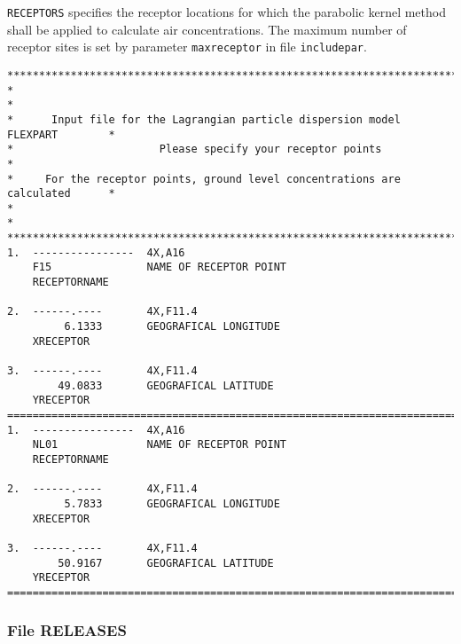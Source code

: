 \documentclass{egu}                  %
\begin{document}
\verb|RECEPTORS| specifies the receptor locations for which the parabolic
kernel method shall be applied to calculate air concentrations.  The maximum
number of receptor sites is set by parameter \verb|maxreceptor| in file
\verb|includepar|.
\begin{scriptsize}\begin{verbatim}
********************************************************************************
*                                                                              *
*      Input file for the Lagrangian particle dispersion model FLEXPART        * 
*                       Please specify your receptor points                    * 
*     For the receptor points, ground level concentrations are calculated      * 
*                                                                              *
********************************************************************************
1.  ----------------  4X,A16
    F15               NAME OF RECEPTOR POINT
    RECEPTORNAME

2.  ------.----       4X,F11.4
         6.1333       GEOGRAFICAL LONGITUDE
    XRECEPTOR

3.  ------.----       4X,F11.4
        49.0833       GEOGRAFICAL LATITUDE
    YRECEPTOR
================================================================================
1.  ----------------  4X,A16
    NL01              NAME OF RECEPTOR POINT
    RECEPTORNAME

2.  ------.----       4X,F11.4
         5.7833       GEOGRAFICAL LONGITUDE
    XRECEPTOR

3.  ------.----       4X,F11.4
        50.9167       GEOGRAFICAL LATITUDE
    YRECEPTOR
================================================================================
\end{verbatim}\end{scriptsize}

\newpage

\subsubsection{File RELEASES}
\end{document}
